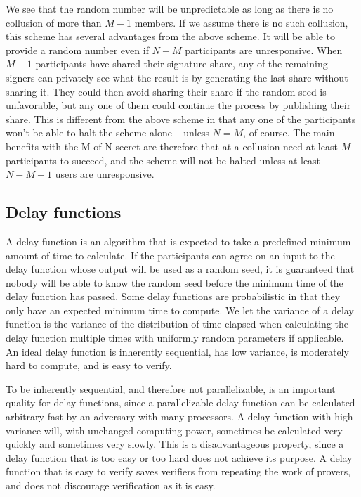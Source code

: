 We see that the random number will be unpredictable as long as there is no collusion of more than $M-1$ members. If we assume there is no such collusion, this scheme has several advantages from the above scheme. It will be able to provide a random number even if $N-M$ participants are unresponsive. When $M-1$ participants have shared their signature share, any of the remaining signers can privately see what the result is by generating the last share without sharing it. They could then avoid sharing their share if the random seed is unfavorable, but any one of them could continue the process by publishing their share. This is different from the above scheme in that any one of the participants won't be able to halt the scheme alone – unless $N=M$, of course. The main benefits with the M-of-N secret are therefore that at a collusion need at least $M$ participants to succeed, and the scheme will not be halted unless at least $N - M + 1$ users are unresponsive.

\subsection{Delay functions}
A delay function is an algorithm that is expected to take a predefined minimum amount of time to calculate. If the participants can agree on an input to the delay function whose output will be used as a random seed, it is guaranteed that nobody will be able to know the random seed before the minimum time of the delay function has passed. Some delay functions are probabilistic in that they only have an expected minimum time to compute. We let the variance of a delay function is the variance of the distribution of time elapsed when calculating the delay function multiple times with uniformly random parameters if applicable. An ideal delay function is inherently sequential, has low variance, is moderately hard to compute, and is easy to verify.

To be inherently sequential, and therefore not parallelizable, is an important quality for delay functions, since a parallelizable delay function can be calculated arbitrary fast by an adversary with many processors. A delay function with high variance will, with unchanged computing power, sometimes be calculated very quickly and sometimes very slowly. This is a disadvantageous property, since a delay function that is too easy or too hard does not achieve its purpose. A delay function that is easy to verify saves verifiers from repeating the work of provers, and does not discourage verification as it is easy.


